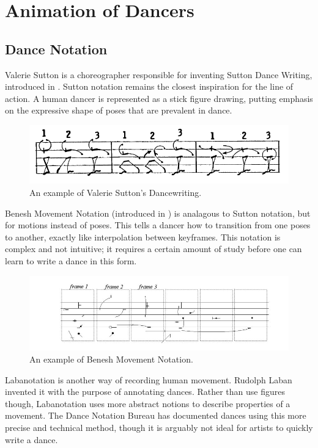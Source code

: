\section{Animation of Dancers}
\subsection{Dance Notation}
Valerie Sutton is a choreographer responsible for inventing Sutton Dance Writing, introduced in \citep{sutton1979sutton}. Sutton notation remains the closest inspiration for the line of action. A human dancer is represented as a stick figure drawing, putting emphasis on the expressive shape of poses that are prevalent in dance.

\begin{figure}[!h]
\centering
\includegraphics[scale=0.5]{img/sutton}
\caption{An example of Valerie Sutton's Dancewriting.}
\end{figure}

Benesh Movement Notation (introduced in \citep{causley1980introduction}) is analagous to Sutton notation, but for motions instead of poses. This tells a dancer how to transition from one poses to another, exactly like interpolation between keyframes. This notation is complex and not intuitive; it requires a certain amount of study before one can learn to write a dance in this form.

\begin{figure}[!h]
\centering
\includegraphics[scale=0.5]{img/benesh}
\caption{An example of Benesh Movement Notation.}
\end{figure}

Labanotation is another way of recording human movement. Rudolph Laban invented it with the purpose of annotating dances. Rather than use figures though, Labanotation uses more abstract notions to describe properties of a movement. The Dance Notation Bureau has documented dances using this more precise and technical method, though it is arguably not ideal for artists to quickly write a dance.

